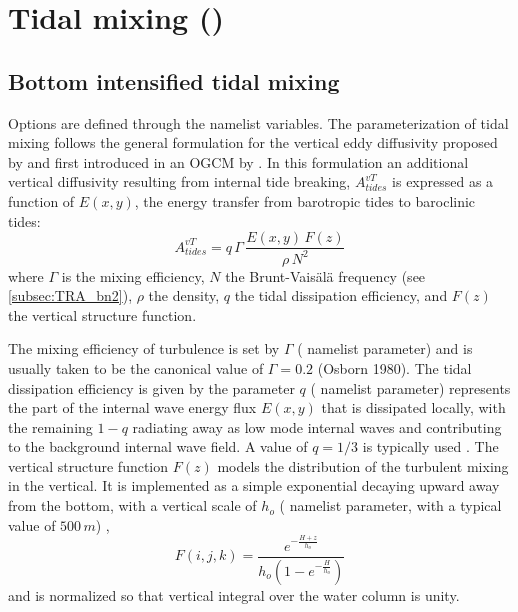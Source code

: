 \documentclass[../tex_main/NEMO_manual]{subfiles}
\begin{document}
\section{Tidal mixing (\protect{})}
\label{sec:ZDF_tmx}

%


\subsection{Bottom intensified tidal mixing}
\label{subsec:ZDF_tmx_bottom}

Options are defined through the   namelist variables.
The parameterization of tidal mixing follows the general formulation for the vertical eddy diffusivity proposed by
\citet{St_Laurent_al_GRL02} and first introduced in an OGCM by \citep{Simmons_al_OM04}. 
In this formulation an additional vertical diffusivity resulting from internal tide breaking,
$A^{vT}_{tides}$ is expressed as a function of $E(x,y)$,
the energy transfer from barotropic tides to baroclinic tides:
\begin{equation} \label{eq:Ktides}
A^{vT}_{tides} =  q \,\Gamma \,\frac{ E(x,y) \, F(z) }{ \rho \, N^2 }
\end{equation}
where $\Gamma$ is the mixing efficiency, $N$ the Brunt-Vais\"{a}l\"{a} frequency (see \autoref{subsec:TRA_bn2}),
$\rho$ the density, $q$ the tidal dissipation efficiency, and $F(z)$ the vertical structure function. 

The mixing efficiency of turbulence is set by $\Gamma$ ( namelist parameter) and
is usually taken to be the canonical value of $\Gamma = 0.2$ (Osborn 1980). 
The tidal dissipation efficiency is given by the parameter $q$ ( namelist parameter)
represents the part of the internal wave energy flux $E(x, y)$ that is dissipated locally,
with the remaining $1-q$ radiating away as low mode internal waves and
contributing to the background internal wave field.
A value of $q=1/3$ is typically used \citet{St_Laurent_al_GRL02}.
The vertical structure function $F(z)$ models the distribution of the turbulent mixing in the vertical.
It is implemented as a simple exponential decaying upward away from the bottom,
with a vertical scale of $h_o$ ( namelist parameter,
with a typical value of $500\,m$) \citep{St_Laurent_Nash_DSR04}, 
\begin{equation} \label{eq:Fz}
F(i,j,k) = \frac{ e^{ -\frac{H+z}{h_o} } }{ h_o \left( 1- e^{ -\frac{H}{h_o} } \right) }
\end{equation}
and is normalized so that vertical integral over the water column is unity. 
\end{document}
